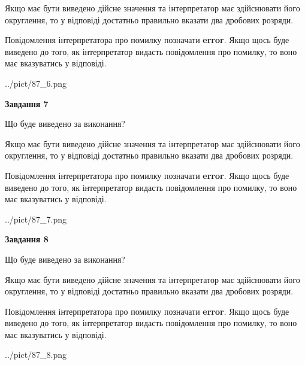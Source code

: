 \documentclass[12pt, ukrainian]{article}
\begin{document}
{\begin {Large}
Якщо має бути виведено дійсне значення та інтерпретатор має здійснювати його округлення, 
то у відповіді достатньо правильно вказати два дробових розряди.

Повідомлення інтерпретатора про помилку позначати \textbf{error}.
Якщо щось буде виведено до того, як інтерпретатор видасть повідомлення про помилку, 
то воно має вказуватись у відповіді. \par

\begin{center}
	{../pict/87_6.png}
\end{center}
\newpage

{\begin {center}\textbf{Завдання 7}\end {center}}\par
Що буде виведено за виконання? \par

Якщо має бути виведено дійсне значення та інтерпретатор має здійснювати його округлення, 
то у відповіді достатньо правильно вказати два дробових розряди.

Повідомлення інтерпретатора про помилку позначати \textbf{error}.
Якщо щось буде виведено до того, як інтерпретатор видасть повідомлення про помилку, 
то воно має вказуватись у відповіді. \par

\begin{center}
	{../pict/87_7.png}
\end{center}
\newpage

{\begin {center}\textbf{Завдання 8}\end {center}}\par
Що буде виведено за виконання? \par

Якщо має бути виведено дійсне значення та інтерпретатор має здійснювати його округлення, 
то у відповіді достатньо правильно вказати два дробових розряди.

Повідомлення інтерпретатора про помилку позначати \textbf{error}.
Якщо щось буде виведено до того, як інтерпретатор видасть повідомлення про помилку, 
то воно має вказуватись у відповіді. \par

\begin{center}
	{../pict/87_8.png}
\end{center}
\newpage


\end{Large}}
\end{document}
